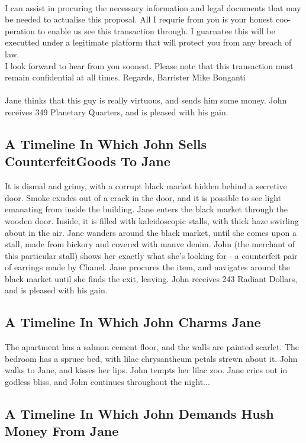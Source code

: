 \documentclass{article}
\begin{document}
\\
I can assist in procuring the necessary information and legal documents that may be needed to actualise this proposal.
All I requrie from you is your honest coo{-}peration to enable us see this transaction through.
I guarnatee this will be executted under a legitimate platform that will protect you from any breach of law.
\\
I look forward to hear from you soonest.
Please note that this transaction must remain confidential at all times.
Regards, Barrister Mike Bonganti
\\\\
Jane thinks that this guy is really virtuous, and sends him some money.
John receives 349 Planetary Quarters, and is pleased with his gain.
\subsection{A Timeline In Which John Sells CounterfeitGoods To Jane}


It is dismal and grimy, with a corrupt black market hidden behind a secretive door.
Smoke exudes out of a crack in the door, and it is possible to see light emanating from inside the building.
Jane enters the black market through the wooden door.
Inside, it is filled with kaleidoscopic stalls, with thick haze swirling about in the air.
Jane wanders around the black market, until she comes upon a stall, made from hickory and covered with mauve denim.
John (the merchant of this particular stall) shows her exactly what she's looking for {-} a counterfeit pair of earrings made by Chanel.
Jane procures the item, and navigates around the black market until she finds the exit, leaving.
John receives 243 Radiant Dollars, and is pleased with his gain.
\subsection{A Timeline In Which John Charms Jane}


The apartment has a salmon cement floor, and the walls are painted scarlet.
The bedroom has a spruce bed, with lilac chrysantheum petals strewn about it.
John walks to Jane, and kisses her lips.
John tempts her lilac zoo.
Jane cries out in godless bliss, and John continues throughout the night...
\subsection{A Timeline In Which John Demands Hush Money From Jane}
\end{document}
